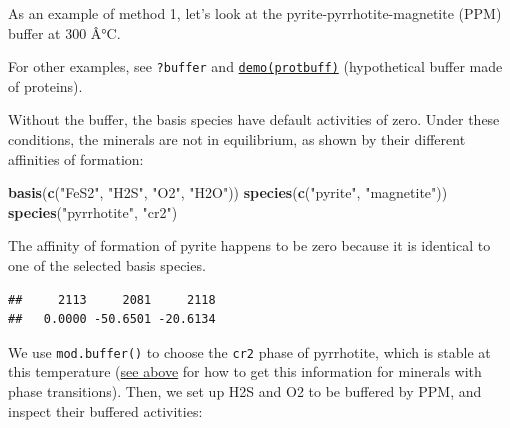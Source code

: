 \documentclass[]{tufte-handout}
\newenvironment{Shaded}{}{}
\newcommand{\KeywordTok}[1]{\textcolor[rgb]{0.00,0.44,0.13}{\textbf{#1}}}
\newcommand{\DataTypeTok}[1]{\textcolor[rgb]{0.56,0.13,0.00}{#1}}
\newcommand{\DecValTok}[1]{\textcolor[rgb]{0.25,0.63,0.44}{#1}}
\newcommand{\StringTok}[1]{\textcolor[rgb]{0.25,0.44,0.63}{#1}}
\newcommand{\OperatorTok}[1]{\textcolor[rgb]{0.40,0.40,0.40}{#1}}
\newcommand{\NormalTok}[1]{#1}
\begin{document}
As an example of method 1, let's look at the pyrite-pyrrhotite-magnetite
(PPM) buffer at 300 Â°C.

\begin{marginfigure}
For other examples, see {\texttt{?buffer}} and
\href{../demo}{{\texttt{demo(protbuff)}}} (hypothetical buffer made of
proteins).
\end{marginfigure}

Without the buffer, the basis species have default activities of zero.
Under these conditions, the minerals are not in equilibrium, as shown by
their different affinities of formation:

\begin{Shaded}
\begin{Highlighting}[]
\KeywordTok{basis}\NormalTok{(}\KeywordTok{c}\NormalTok{(}\StringTok{"FeS2"}\NormalTok{, }\StringTok{"H2S"}\NormalTok{, }\StringTok{"O2"}\NormalTok{, }\StringTok{"H2O"}\NormalTok{))}
\KeywordTok{species}\NormalTok{(}\KeywordTok{c}\NormalTok{(}\StringTok{"pyrite"}\NormalTok{, }\StringTok{"magnetite"}\NormalTok{))}
\KeywordTok{species}\NormalTok{(}\StringTok{"pyrrhotite"}\NormalTok{, }\StringTok{"cr2"}\NormalTok{)}
\end{Highlighting}
\end{Shaded}

\begin{marginfigure}
The affinity of formation of pyrite happens to be zero because it is
identical to one of the selected basis species.
\end{marginfigure}

\begin{Shaded}
\end{Shaded}

\begin{verbatim}
##     2113     2081     2118 
##   0.0000 -50.6501 -20.6134
\end{verbatim}

We use {\texttt{mod.buffer()}} to choose the \texttt{cr2} phase of
pyrrhotite, which is stable at this temperature
(\protect\hyperlink{mosaic-diagrams}{see above} for how to get this
information for minerals with phase transitions). Then, we set up H2S
and O2 to be buffered by PPM, and inspect their buffered activities:
\end{document}
